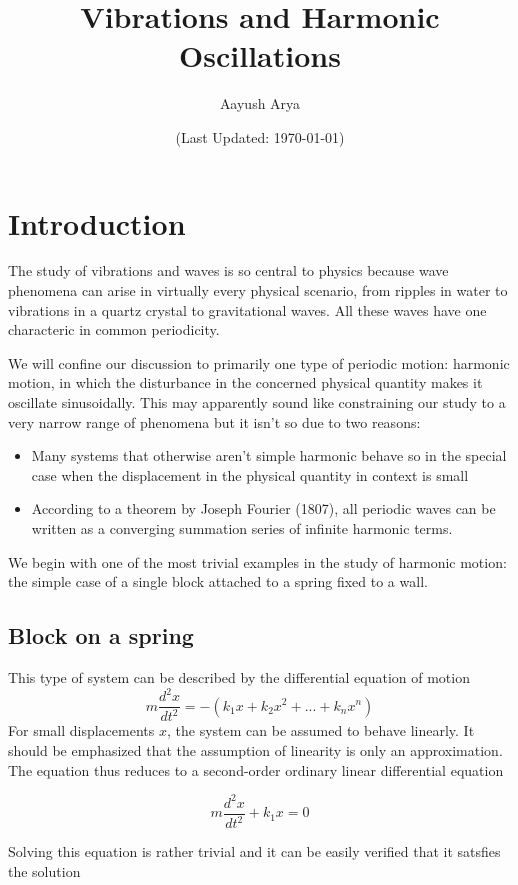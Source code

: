 \documentclass{article}
\title{Vibrations and Harmonic Oscillations}
\author{Aayush Arya}
\date{(Last Updated: \today)}
\newcommand{\DD}[2]{\frac{d^2 #1}{d {#2}^2}}
\begin{document}
	
\maketitle

{
	\hypersetup{linkcolor=black}
	\tableofcontents
}

\section{Introduction}
The study of vibrations and waves is so central to physics because wave phenomena can arise in virtually every physical scenario, from ripples in water to vibrations in a quartz crystal to gravitational waves. All these waves have one characteric in common \textemdash periodicity.

We will confine our discussion to primarily one type of periodic motion: harmonic motion, in which the disturbance in the concerned physical quantity makes it oscillate sinusoidally. This may apparently sound like constraining our study to a very narrow range of phenomena but it isn't so due to two reasons:

\begin{itemize}
	\item Many systems that otherwise aren't simple harmonic behave so in the special case when the displacement in the physical quantity in context is small
	\item According to a theorem by Joseph Fourier (1807), all periodic waves can be written as a converging summation series of infinite harmonic terms.
\end{itemize}

We begin with one of the most trivial examples in the study of harmonic motion: the simple case of a single block attached to a spring fixed to a wall.

	\subsection{Block on a spring}
	This type of system can be described by the differential equation of motion
	$$ m\DD{x}{t} = -(k_1x + k_2x^2 + ... + k_nx^n) $$
	For small displacements $x$, the system can be assumed to behave linearly. It should be emphasized that the assumption of linearity is only an approximation. The equation thus reduces to a second-order ordinary linear differential equation
	
	$$ m\DD{x}{t} + k_1x = 0 $$
	
	Solving this equation is rather trivial and it can be easily verified that it satsfies the solution
	
\end{document}
